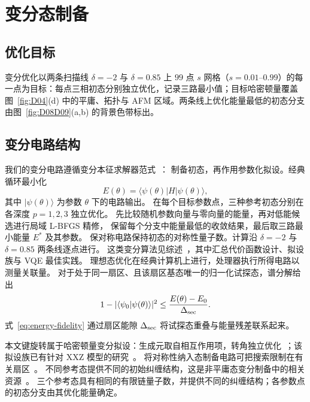 \section{变分态制备}
\label{sec:ansatz}

\subsection{优化目标}
\label{sec:points}

变分优化以两条扫描线 $\delta=-2$ 与 $\delta=0.85$ 上 $99$ 点 $s$ 网格（$s=0.01$--$0.99$）的每一点为目标：每点三相初态分别独立优化，记录三路最小值；目标哈密顿量覆盖图~\ref{fig:D04}(d) 中的平庸、拓扑与 AFM 区域。两条线上优化能量最低的初态分支由图~\ref{fig:D08D09}(a,b) 的背景色带标出。

\subsection{变分电路结构}

我们的变分电路遵循变分本征求解器范式~\cite{peruzzo2014variational}：
制备初态，再作用参数化拟设。经典循环最小化
\begin{equation}
E(\theta)=\langle\psi(\theta)|H|\psi(\theta)\rangle,
\end{equation}
其中 $|\psi(\theta)\rangle$ 为参数 $\theta$ 下的电路输出。
在每个目标参数点，三种参考初态分别在各深度 $p=1,2,3$ 独立优化。
先比较随机参数向量与零向量的能量，再对低能候选进行局域 L-BFGS 精修，
保留每个分支中能量最低的收敛结果，最后取三路最小能量 $E^*$ 及其参数。
保对称电路保持初态的对称性量子数。计算沿 $\delta=-2$ 与 $\delta=0.85$ 两条线逐点进行。
这类变分算法见综述~\cite{cerezo2021variational,tilly2022variational}，其中汇总代价函数设计、拟设族与 VQE 最佳实践。
理想态优化在经典计算机上进行，处理器执行所得电路以测量关联量。
对于处于同一扇区、且该扇区基态唯一的归一化试探态，谱分解给出
\begin{equation}
1-|\langle\psi_0|\psi(\theta)\rangle|^2
\leq \frac{E(\theta)-E_0}{\Delta_{\rm sec}}.
\label{eq:energy-fidelity}
\end{equation}
式~\eqref{eq:energy-fidelity} 通过扇区能隙 $\Delta_{\rm sec}$ 将试探态重叠与能量残差联系起来。

本文键旋转属于哈密顿量变分拟设：生成元取自相互作用项，转角独立优化~\cite{wecker2015progress}；该拟设族已有针对 XXZ 模型的研究~\cite{wiersema2020exploring}。
将对称性纳入态制备电路可把搜索限制在有关扇区~\cite{gard2020efficient}。
不同参考态提供不同的初始纠缠结构，这是非平庸态变分制备中的相关资源~\cite{ho2019efficient}。
三个参考态具有相同的有限链量子数，并提供不同的纠缠结构；各参数点的初态分支由其优化能量确定。

